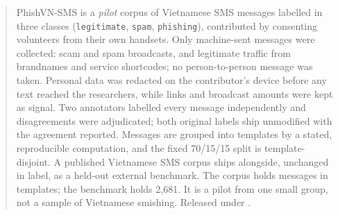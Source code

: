 \begin{abstract}
\noindent PhishVN-SMS is a \emph{pilot} corpus of Vietnamese SMS messages labelled in three
classes (\texttt{legitimate}, \texttt{spam}, \texttt{phishing}), contributed by consenting
volunteers from their own handsets. Only machine-sent messages were collected: scam and spam
broadcasts, and legitimate traffic from brandnames and service shortcodes; no person-to-person
message was taken. Personal data was redacted on the contributor's device before any text
reached the researchers, while links and broadcast amounts were kept as signal. Two annotators
labelled every message independently and disagreements were adjudicated; both original labels
ship unmodified with the agreement reported. Messages are grouped into templates by a stated,
reproducible computation, and the fixed 70/15/15 split is template-disjoint. A published
Vietnamese SMS corpus ships alongside, unchanged in label, as a held-out external benchmark. The
corpus holds  messages in  templates; the benchmark holds 2{,}681. It is a pilot
from one small group, not a sample of Vietnamese smishing. Released under .
\end{abstract}
